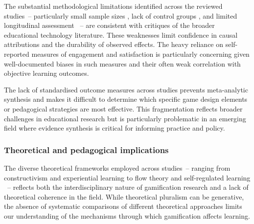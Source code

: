 \documentclass[a4paper,fleqn]{cas-sc}
\begin{document}
The substantial methodological limitations identified across the reviewed studies~-- particularly small sample sizes \citep{1Barbatsis201159, 2Mahamarowi2023133, 5kazanidis2018alpha, 6Czerwinski2018, 12Gilbert2019108, 14Forsyth2023, 21Ghulamani2017, 22Nugroho2020149, 25Repantis2011502, 36Scholz2021, 50Lye2013, 51Ardito2007, 73Wolfartsberger2011160}, lack of control groups \citep{14Forsyth2023, 22Nugroho2020149, 32Cheng20241718, 59Kee2014270, 75trajano2014using, 78Rouse2022357}, and limited longitudinal assessment \citep{2Mahamarowi2023133, 5kazanidis2018alpha, 13Humpire2022, 22Nugroho2020149, 32Cheng20241718, 40Kuran2018, 47Clara2010156}~-- are consistent with critiques of the broader educational technology literature. These weaknesses limit confidence in causal attributions and the durability of observed effects. The heavy reliance on self-reported measures of engagement and satisfaction \citep{9Lin2018, 12Gilbert2019108, 15Slater2022, 47Clara2010156, 53Perez2014, 55Squire2004, 62Milosz201896, 71lynch2015pedagogical} is particularly concerning given well-documented biases in such measures and their often weak correlation with objective learning outcomes.

The lack of standardised outcome measures across studies prevents meta-analytic synthesis and makes it difficult to determine which specific game design elements or pedagogical strategies are most effective. This fragmentation reflects broader challenges in educational research but is particularly problematic in an emerging field where evidence synthesis is critical for informing practice and policy.

\subsubsection{Theoretical and pedagogical implications}

The diverse theoretical frameworks employed across studies~-- ranging from constructivism \citep{1Barbatsis201159, 3Watson2011466, 14Forsyth2023, 34Serrano2023, 61Karsenti202027, 72hutauruk2020utilization} and experiential learning \citep{1Barbatsis201159, 18Shih201054, 20Erandaru2014, 25Repantis2011502, 51Ardito2007, 58Shih2015173, 59Kee2014270} to flow theory \citep{16Chen201447, 45Yu2016727, 52Lin2011265, 60Hoy2018, 63Liu2021, 70Hou201519} and self-regulated learning \citep{11Ternblad2023115, 17Manzanares2019}~-- reflects both the interdisciplinary nature of gamification research and a lack of theoretical coherence in the field. While theoretical pluralism can be generative, the absence of systematic comparisons of different theoretical approaches limits our understanding of the mechanisms through which gamification affects learning.
\end{document}
